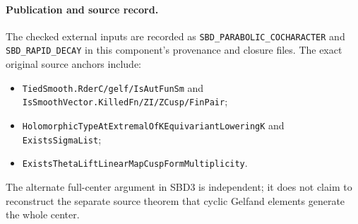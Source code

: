 \paragraph{Publication and source record.}
The checked external inputs are recorded as
\texttt{SBD\_\allowbreak PARABOLIC\_\allowbreak COCHARACTER} and
\texttt{SBD\_\allowbreak RAPID\_\allowbreak DECAY} in this component's provenance and
closure files.  The exact original source anchors include:
\begin{itemize}
\item \texttt{Tied\allowbreak Smooth.\allowbreak Rder\allowbreak C/\allowbreak gelf/\allowbreak Is\allowbreak Aut\allowbreak Fun\allowbreak Sm}
and \texttt{Is\allowbreak Smooth\allowbreak Vector.\allowbreak Killed\allowbreak Fn/\allowbreak ZI/\allowbreak ZCusp/\allowbreak Fin\allowbreak Pair};
\item \texttt{Holomorphic\allowbreak Type\allowbreak At\allowbreak Extremal\allowbreak Of\allowbreak KEquivariant\allowbreak Lowering\allowbreak K}
and \texttt{Exists\allowbreak Sigma\allowbreak List};
\item \texttt{Exists\allowbreak Theta\allowbreak Lift\allowbreak Linear\allowbreak Map\allowbreak Cusp\allowbreak Form\allowbreak Multiplicity}.
\end{itemize}
The alternate full-center argument in SBD3 is independent;
it does not claim to reconstruct the separate source theorem
that cyclic Gelfand elements generate the whole center.
